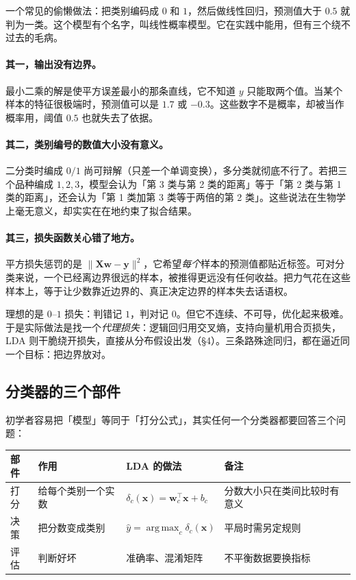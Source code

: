 \documentclass[11pt,a4paper,fontset=windows,zihao=-4]{ctexart}
\newcommand{\bX}{\mathbf{X}}
\newcommand{\by}{\mathbf{y}}
\newcommand{\bw}{\mathbf{w}}
\newcommand{\bx}{\mathbf{x}}
\newcommand{\tp}{^{\top}}
\DeclareMathOperator*{\argmax}{arg\,max}
\newcommand{\tabhead}{\sffamily\bfseries\color{navy}}
\begin{document}
一个常见的偷懒做法：把类别编码成 $0$ 和 $1$，然后做线性回归，预测值大于 $0.5$ 就判为一类。这个模型有个名字，叫线性概率模型。它在实践中能用，但有三个绕不过去的毛病。

\paragraph{其一，输出没有边界。}最小二乘的解是使平方误差最小的那条直线，它不知道 $y$ 只能取两个值。当某个样本的特征很极端时，预测值可以是 $1.7$ 或 $-0.3$。这些数字不是概率，却被当作概率用，阈值 $0.5$ 也就失去了依据。

\paragraph{其二，类别编号的数值大小没有意义。}二分类时编成 $0/1$ 尚可辩解（只差一个单调变换），多分类就彻底不行了。若把三个品种编成 $1,2,3$，模型会认为「第 3 类与第 2 类的距离」等于「第 2 类与第 1 类的距离」，还会认为「第 1 类加第 3 类等于两倍的第 2 类」。这些说法在生物学上毫无意义，却实实在在地约束了拟合结果。

\paragraph{其三，损失函数关心错了地方。}平方损失惩罚的是 $\lVert \bX\bw-\by\rVert^2$，它希望\emph{每个}样本的预测值都贴近标签。可对分类来说，一个已经离边界很远的样本，被推得更远没有任何收益。把力气花在这些样本上，等于让少数靠近边界的、真正决定边界的样本失去话语权。

\begin{add}[分类任务的损失应该是什么]
理想的是 $0$--$1$ 损失：判错记 $1$，判对记 $0$。但它不连续、不可导，优化起来极难。于是实际做法是找一个\emph{代理损失}：逻辑回归用交叉熵，支持向量机用合页损失，LDA 则干脆绕开损失，直接从分布假设出发（\S4）。三条路殊途同归，都在逼近同一个目标：把边界放对。
\end{add}

\subsection{分类器的三个部件}

初学者容易把「模型」等同于「打分公式」，其实任何一个分类器都要回答三个问题：

\begin{center}
\small
\begin{tabular}{@{}p{2.4cm}p{3.4cm}p{3.6cm}p{4.4cm}@{}}
\toprule
\rowcolor{navy!7}
\tabhead 部件 & \tabhead 作用 & \tabhead LDA 的做法 & \tabhead 备注\\
\midrule
打分 & 给每个类别一个实数 & $\delta_c(\bx)=\bw_c\tp\bx+b_c$ & 分数大小只在类间比较时有意义\\[3pt]
决策 & 把分数变成类别 & $\hat y=\argmax_c\delta_c(\bx)$ & 平局时需另定规则\\[3pt]
评估 & 判断好坏 & 准确率、混淆矩阵 & 不平衡数据要换指标\\
\bottomrule
\end{tabular}
\end{center}
\end{document}
